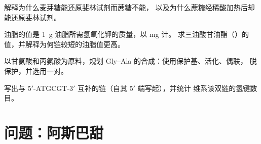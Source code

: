 \begin{exercise}[$\star\star$]\label{exo:b2:biomolecules:9}
解释为什么麦芽糖能还原斐林试剂而蔗糖不能，
以及为什么蔗糖经稀酸加热后却能还原斐林试剂。
\end{exercise}

\begin{exercise}[$\star\star\star$]\label{exo:b2:biomolecules:10}
油脂的值是 1~g 油脂所需氢氧化钾的质量，以 mg 计。
求三油酸甘油酯（）的值，并解释为何链较短的油脂值更高。
\end{exercise}

\begin{exercise}[$\star\star\star$]\label{exo:b2:biomolecules:11}
以甘氨酸和丙氨酸为原料，规划 Gly--Ala 的合成：使用保护基、活化、偶联，
脱保护，并选用一对。
\end{exercise}

\begin{exercise}[$\star\star\star$]\label{exo:b2:biomolecules:12}
写出与 5$'$-ATGCGT-3$'$ 互补的链（自其 5$'$ 端写起），并统计
维系该双链的氢键数目。
\end{exercise}

\section{问题：阿斯巴甜}

